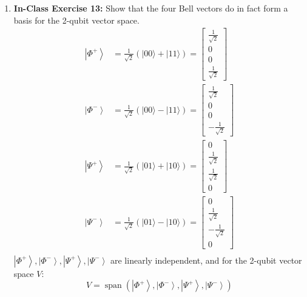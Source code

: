 \documentclass[main.tex]{subfiles}
\begin{document}
\begin{enumerate}
\item[] \textbf{In-Class Exercise 13:}  Show that the four Bell vectors do in fact form a basis for the 2-qubit vector space.
    \begin{align*}
        \left|\Phi^{+}\right\rangle & = \frac{1}{\sqrt{2}}(|00\rangle+|11\rangle)
                                    = \left[\begin{array}{l} \frac{1}{\sqrt{2}} \\ 0 \\ 0 \\ \frac{1}{\sqrt{2}} \end{array}\right]\\ 
        \left|\Phi^{-}\right\rangle & = \frac{1}{\sqrt{2}}(|00\rangle-|11\rangle)
                                    = \left[\begin{array}{l} \frac{1}{\sqrt{2}} \\ 0 \\ 0 \\ -\frac{1}{\sqrt{2}} \end{array}\right]\\ 
        \left|\Psi^{+}\right\rangle & = \frac{1}{\sqrt{2}}(|01\rangle+|10\rangle)
                                    = \left[\begin{array}{l} 0 \\ \frac{1}{\sqrt{2}} \\ \frac{1}{\sqrt{2}} \\ 0 \end{array}\right]\\ 
        \left|\Psi^{-}\right\rangle & = \frac{1}{\sqrt{2}}(|01\rangle-|10\rangle)
                                    = \left[\begin{array}{l} 0 \\ \frac{1}{\sqrt{2}} \\ -\frac{1}{\sqrt{2}} \\ 0 \end{array}\right]\\ 
    \end{align*}
    $\left|\Phi^{+}\right\rangle, \left|\Phi^{-}\right\rangle, \left|\Psi^{+}\right\rangle, \left|\Psi^{-}\right\rangle$ are linearly independent, and for the 2-qubit vector space $V$:
    $$V = \operatorname{span}\left(\left|\Phi^{+}\right\rangle,\left|\Phi^{-}\right\rangle,\left|\Psi^{+}\right\rangle,\left|\Psi^{-}\right\rangle\right)$$

\end{enumerate}
\end{document}
